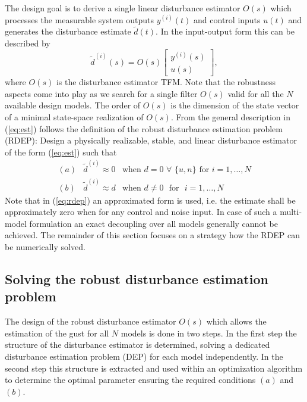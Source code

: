 \documentclass[graybox]{svmult}
\begin{document}
The design goal is to derive a single linear disturbance estimator $O(s)$ which processes the measurable system outputs $y^{(i)}(t)$ and control inputs $u(t)$ and generates the disturbance estimate $\tilde d(t)$. In the input-output form this can be described by
\begin{equation}\label{eq:est}
	\tilde d^{(i)}(s) = O(s)
	\begin{bmatrix}
		y^{(i)}(s) \\ u(s)
	\end{bmatrix},
\end{equation}
where $O(s)$ is the disturbance estimator TFM. Note that the robustness aspects come into play as we search for a single filter $O(s)$ valid for all the $N$ available design models.
The order of $O(s)$ is the dimension of the state vector of a minimal state-space realization of $O(s)$.
From the general description in (\ref{eq:est}) follows the definition of the robust disturbance estimation problem (RDEP): Design a physically realizable, stable, and linear disturbance estimator of the form (\ref{eq:est}) such that 
\begin{equation}\label{eq:rdep}
	\begin{array}{lll}
		(a) & \tilde d^{(i)}  \approx 0 &\text{when } d = 0  \,\, \forall  \,\, \{u, n \} \text{  for  } i=1,\dots,N\\ 
		(b) &\tilde d^{(i)} \approx d &\text{when } d \neq 0 \,\, \text{  for  } \,\, i=1,\dots,N 
	\end{array}
\end{equation}
Note that in (\ref{eq:rdep}) an approximated form is used, i.e. the estimate shall be approximately zero when for any control and noise input. In case of such a multi-model formulation an exact decoupling over all models generally cannot be achieved. The remainder of this section focuses on a strategy how the RDEP can be numerically solved.



\subsection{Solving the robust disturbance estimation problem}\label{sec:rdep}
The design of the robust disturbance estimator $O(s)$ which allows the estimation of the gust for all $N$ models is done in two steps. In the first step the structure of the disturbance estimator is determined, solving a dedicated disturbance estimation problem (DEP) for each model independently. In the second step this structure is extracted and used within an optimization algorithm to determine the optimal parameter ensuring the required conditions $(a)$ and $(b)$.
\end{document}
